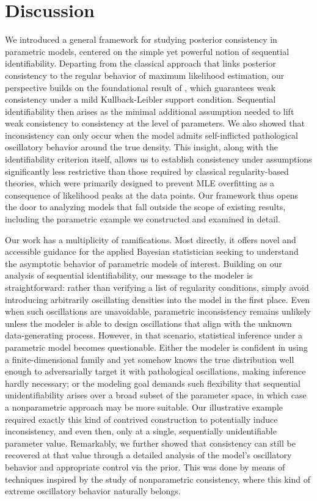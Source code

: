 \documentclass[11pt,twoside]{article}
\begin{document}
\section{Discussion}\label{sec:discussion}

We introduced a general framework for studying posterior consistency in parametric models, centered on the simple yet powerful notion of sequential identifiability. Departing from the classical approach that links posterior consistency to the regular behavior of maximum likelihood estimation, our perspective builds on the foundational result of \citet{schwartz1964consistency}, which guarantees weak consistency under a mild Kullback-Leibler support condition. Sequential identifiability then arises as the minimal additional assumption needed to lift weak consistency to consistency at the level of parameters. We also showed that inconsistency can only occur when the model admits self-inflicted pathological oscillatory behavior around the true density. This insight, along with the identifiability criterion itself, allows us to establish consistency under assumptions significantly less restrictive than those required by classical regularity-based theories, which were primarily designed to prevent MLE overfitting as a consequence of likelihood peaks at the data points. Our framework thus opens the door to analyzing models that fall outside the scope of existing results, including the parametric example we constructed and examined in detail.

Our work has a multiplicity of ramifications. Most directly, it offers novel and accessible guidance for the applied Bayesian statistician seeking to understand the asymptotic behavior of parametric models of interest. Building on our analysis of sequential identifiability, our message to the modeler is straightforward: rather than verifying a list of regularity conditions, simply avoid introducing arbitrarily oscillating densities into the model in the first place. Even when such oscillations are unavoidable, parametric inconsistency remains unlikely unless the modeler is able to design oscillations that align with the unknown data-generating process. However, in that scenario, statistical inference under a parametric model becomes questionable. Either the modeler is confident in using a finite-dimensional family and yet somehow knows the true distribution well enough to adversarially target it with pathological oscillations, making inference hardly necessary; or the modeling goal demands such flexibility that sequential unidentifiability arises over a broad subset of the parameter space, in which case a nonparametric approach may be more suitable. Our illustrative example required exactly this kind of contrived construction to potentially induce inconsistency, and even then, only at a single, sequentially unidentifiable parameter value. Remarkably, we further showed that consistency can still be recovered at that value through a detailed analysis of the model’s oscillatory behavior and appropriate control via the prior. This was done by means of techniques inspired by the study of nonparametric consistency, where this kind of extreme oscillatory behavior naturally belongs.
\end{document}
